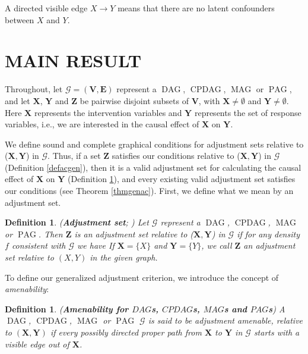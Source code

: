 \documentclass[]{article}
\DeclareMathOperator{\CPDAG}{CPDAG}
\DeclareMathOperator{\DAG}{DAG}
\DeclareMathOperator{\MAG}{MAG}
\DeclareMathOperator{\PAG}{PAG}
\newtheorem{definition}[theorem]{Definition}
\theoremstyle{definition}
\theoremstyle{remark}
\newcommand{\vars}[1][V]{\mathbf{#1}}
\newcommand{\e}[1][E]{\mathbf{#1}}
\newcommand{\g}[1][G]{\mathcal{#1}}
\begin{document}
A directed visible edge $X\rightarrow Y$ means that there are no latent confounders between $X$ and $Y$.

\section{MAIN RESULT}\label{sec: main result}

Throughout, let $\g=(\vars,\e)$ represent a $\DAG$, $\CPDAG$, $\MAG$ or $\PAG$, and let $\mathbf{X}$, $\mathbf{Y}$ and $\mathbf{Z}$ be pairwise disjoint subsets of $\vars$, with $\mathbf{X}\neq \emptyset$ and $\mathbf{Y}\neq \emptyset$. Here $\mathbf{X}$ represents the intervention variables and $\mathbf{Y}$ represents the set of response variables, i.e., we are interested in the causal effect of $\mathbf{X}$ on $\mathbf{Y}$. 

We define sound and complete graphical conditions for adjustment sets relative to ($\mathbf{X,Y}$) in $\g$. Thus, if a set $\mathbf{Z}$ satisfies our conditions  relative to ($\mathbf{X},\mathbf{Y}$) in $\g$ (Definition \ref{defacgen}), then it is a valid adjustment set for calculating the causal effect of $\mathbf{X}$ on $\mathbf{Y}$ (Definition \ref{defadjustment}), and every existing valid adjustment set satisfies our conditions (see Theorem \ref{thmgenac}).
First, we define what we mean by an adjustment set.


\begin{definition}{(\textbf{Adjustment set}; \citealp{maathuis2013generalized})}
   Let $\g$ represent a $\DAG$, $\CPDAG$, $\MAG$ or $\PAG$. Then $\mathbf{Z}$ is an adjustment set relative to ($\mathbf{X,Y}$) in $\g$  if for any density $f$ consistent with $\g$ we have
   If $\mathbf{X} = \{X\}$ and $\mathbf{Y} = \{Y\}$, we call $\mathbf{Z}$ an adjustment set relative to $(X,Y)$ in the given graph.
   \label{defadjustment}
\end{definition}

To define our generalized adjustment criterion, we introduce the concept of \textit{amenability}:
\begin{definition}{(\textbf{Amenability for $DAG$s, $CPDAG$s, $MAG$s and $PAG$s})}
  A $\DAG$, $\CPDAG$, $\MAG$ or $\PAG$ $\g$ is said to be adjustment amenable, relative to $(\mathbf{X},\mathbf{Y})$ if every possibly directed proper path from $\mathbf{X}$ to $\mathbf{Y}$ in $\g$ starts with a visible edge out of $\mathbf{X}$.
  \label{defadjamengen}
\end{definition}
\end{document}
